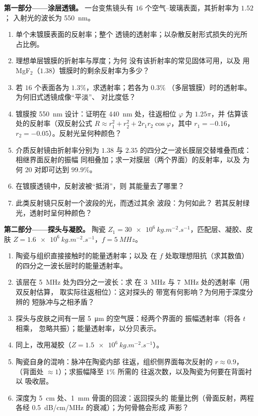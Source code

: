 \begin{problem}
\label{pb:b2:wave-interfaces:1}

\medskip
\noindent\textbf{第一部分——涂层透镜。}
一台变焦镜头有 $16$ 个空气–玻璃表面，其折射率为 $1.52$；
入射光的波长为 \qty{550}{nm}。
\begin{enumerate}
  \item 单个未镀膜表面的反射率；整个
        透镜的透射率；以杂散反射形式损失的光所占比例。
  \item 理想单层镀膜的折射率与厚度；为何
        没有该折射率的常见固体可用，以及
        用 MgF$_2$（$1.38$）镀膜时的剩余反射率为多少？
  \item 若 $16$ 个表面各为 $1.3\%$，求透射率；若各为 $0.3\%$
        （多层镀膜）时的透射率。为何旧式透镜成像“平淡”、
        对比度低？
  \item 镀膜按 \qty{550}{nm} 设计：证明在
        \qty{440}{nm} 处，往返相位 $\varphi$ 为 $1.25\pi$，并
        估算该处的反射率（双反射公式 $R
        \approx r_1^2 + r_2^2 + 2r_1r_2\cos\varphi$，其中 $r_1 = -0.16$，$r_2 =
        -0.05$）。反射光呈何种颜色？
  \item 介质反射镜由折射率分别为 $1.38$ 与
        $2.35$ 的四分之一波长膜层交替堆叠而成：相继界面反射的振幅
        同相叠加；求一对膜层（两个界面）的反射率，以及
        为何 $20$ 对即可达到 $99.9\%$。
  \item 在镀膜透镜中，反射波被“抵消”，则
        其能量去了哪里？
  \item 此类反射镜只反射一个波段的光，而透过其余
        波段：为何如此？
        若其反射绿光，透射时呈何种颜色？
\end{enumerate}

\medskip
\noindent\textbf{第二部分——探头与凝胶。}
陶瓷 $Z_1 = \qty{30e6}{kg.m^{-2}.s^{-1}}$，匹配层、凝胶、皮肤 $Z =
\qty{1.6e6}{kg.m^{-2}.s^{-1}}$，$f = \qty{5}{MHz}$。
\begin{enumerate}[resume]
  \item 陶瓷与组织直接接触时的能量透射率；以及
        在 $f$ 处取理想阻抗（求其数值）的四分之一波长层时的能量透射率。
  \item 该层在 \qty{5}{MHz} 处为四分之一波长：求
        在 \qty{3}{MHz} 与 \qty{7}{MHz} 处的透射率（用双反射估算，
        取实际往返相位）：这对探头的
        带宽有何影响？为何用于深度分辨的
        短脉冲与之相矛盾？
  \item 探头与皮肤之间有一层 \qty{5}{\micro m} 的空气膜：经两个界面的
        振幅透射率（将各 $t$ 相乘，
        忽略共振）；能量透射率，以分贝表示。
  \item 同上，改用凝胶（$Z = \qty{1.5e6}{kg.m^{-2}.s^{-1}}$）。
  \item 陶瓷自身的混响：脉冲在陶瓷内部
        往返，组织侧界面每次反射的 $r \approx 0.9$，
        （背面处 $\approx 1$）；求振幅降至 $1\%$ 所需的
        往返次数，以及陶瓷为何要在背面衬以
        吸收层。
  \item 深度为 \qty{5}{cm} 处、\qty{1}{mm} 骨面的回波：返回探头的
        能量比例（骨面反射，两程各经
        \qty{0.5}{dB/cm/MHz} 的衰减）；为何骨骼会形成
        声影？
\end{enumerate}


\end{problem}
